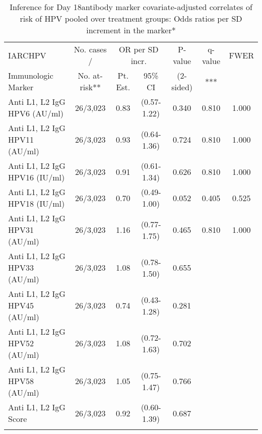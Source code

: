 \begin{longtable}{lcccccc}
\caption{Inference for Day 18antibody marker covariate-adjusted correlates of risk of HPV pooled over treatment groups: Odds ratios per SD increment in the marker*} \\ 
   \hline
 
         \multicolumn{1}{l}{IARCHPV} & \multicolumn{1}{c}{No. cases /}   & \multicolumn{2}{c}{OR per SD incr.}                     & \multicolumn{1}{c}{P-value}   & \multicolumn{1}{c}{q-value}   & \multicolumn{1}{c}{FWER} \\ 
         \multicolumn{1}{l}{Immunologic Marker}            & \multicolumn{1}{c}{No. at-risk**} & \multicolumn{1}{c}{Pt. Est.} & \multicolumn{1}{c}{95\% CI} & \multicolumn{1}{c}{(2-sided)} & \multicolumn{1}{c}{***} & \multicolumn{1}{c}{} \\ 
         \hline
 
    Anti L1, L2 IgG HPV6 (AU/ml) & 26/3,023 & 0.83 & (0.57-1.22) & 0.340 & 0.810 & 1.000 \\ 
  Anti L1, L2 IgG HPV11 (AU/ml) & 26/3,023 & 0.93 & (0.64-1.36) & 0.724 & 0.810 & 1.000 \\ 
  Anti L1, L2 IgG HPV16 (IU/ml) & 26/3,023 & 0.91 & (0.61-1.34) & 0.626 & 0.810 & 1.000 \\ 
  Anti L1, L2 IgG HPV18 (IU/ml) & 26/3,023 & 0.70 & (0.49-1.00) & 0.052 & 0.405 & 0.525 \\ 
  Anti L1, L2 IgG HPV31 (AU/ml) & 26/3,023 & 1.16 & (0.77-1.75) & 0.465 & 0.810 & 1.000 \\ 
  Anti L1, L2 IgG HPV33 (AU/ml) & 26/3,023 & 1.08 & (0.78-1.50) & 0.655 &     &     \\ 
  Anti L1, L2 IgG HPV45 (AU/ml) & 26/3,023 & 0.74 & (0.43-1.28) & 0.281 &     &     \\ 
  Anti L1, L2 IgG HPV52 (AU/ml) & 26/3,023 & 1.08 & (0.72-1.63) & 0.702 &     &     \\ 
  Anti L1, L2 IgG HPV58 (AU/ml) & 26/3,023 & 1.05 & (0.75-1.47) & 0.766 &     &     \\ 
  Anti L1, L2 IgG Score & 26/3,023 & 0.92 & (0.60-1.39) & 0.687 &     &     \\ 
   \hline
\hline
\label{tab:CoR_univariable_logistic_pretty_scaled}
\end{longtable}

